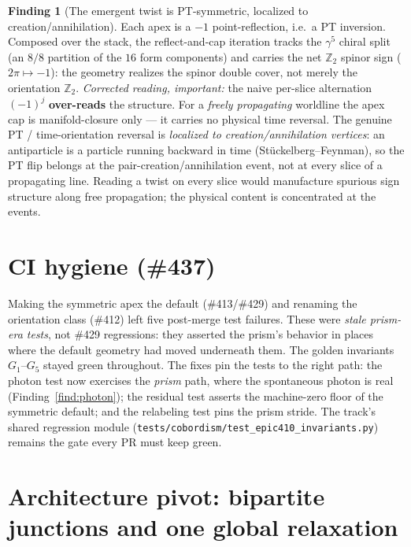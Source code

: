 \documentclass[11pt]{article}
\theoremstyle{definition}
\newtheorem{finding}{Finding}
\newcommand{\Z}{\mathbb{Z}}
\newcommand{\code}[1]{\texttt{#1}}
\begin{document}
\begin{finding}[The emergent twist is PT-symmetric, localized to creation/annihilation]
\label{find:twist}
Each apex is a $-1$ point-reflection, i.e.\ a PT inversion. Composed over the stack, the
reflect-and-cap iteration tracks the $\gamma^5$ chiral split (an $8/8$ partition of the
$16$ form components) and carries the net $\Z_2$ spinor sign ($2\pi\mapsto-1$): the
geometry realizes the spinor double cover, not merely the orientation $\Z_2$.
\emph{Corrected reading, important:} the naive per-slice alternation $(-1)^j$
\textbf{over-reads} the structure. For a \emph{freely propagating} worldline the apex cap
is manifold-closure only --- it carries no physical time reversal. The genuine PT /
time-orientation reversal is \emph{localized to creation/annihilation vertices}: an
antiparticle is a particle running backward in time (St\"uckelberg--Feynman), so the PT
flip belongs at the pair-creation/annihilation event, not at every slice of a propagating
line. Reading a twist on every slice would manufacture spurious sign structure along free
propagation; the physical content is concentrated at the events.
\end{finding}

\section{CI hygiene (\#437)}
\label{sec:ci}

Making the symmetric apex the default (\#413/\#429) and renaming the orientation class
(\#412) left five post-merge test failures. These were \emph{stale prism-era tests}, not
\#429 regressions: they asserted the prism's behavior in places where the default geometry
had moved underneath them. The golden invariants $G_1$--$G_5$ stayed green throughout. The
fixes pin the tests to the right path: the photon test now exercises the \emph{prism} path,
where the spontaneous photon is real (Finding~\ref{find:photon}); the residual test asserts
the machine-zero floor of the symmetric default; and the relabeling test pins the prism
stride. The track's shared regression module
(\code{tests/cobordism/test\_epic410\_invariants.py}) remains the gate every PR must keep
green.

\section{Architecture pivot: bipartite junctions and one global relaxation}
\label{sec:pivot}
\end{document}
